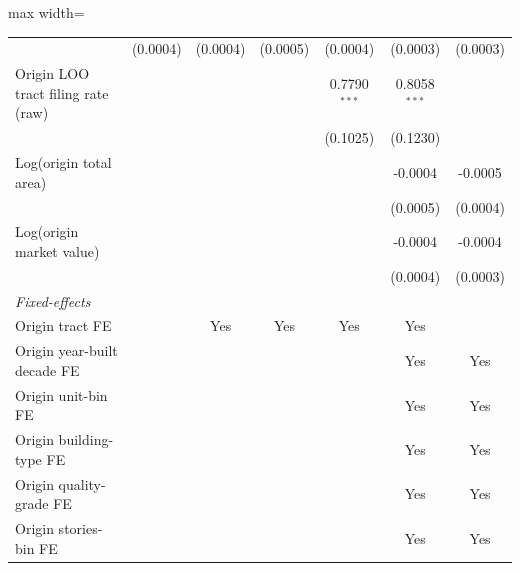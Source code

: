 \documentclass[
  11pt,
]{article}
\begin{document}
\begin{adjustbox}{max width=\textwidth}
\begin{tabular}{lcccccc}
                                                  & (0.0004)               & (0.0004)       & (0.0005)              & (0.0004)       & (0.0003)       & (0.0003)\\   
   Origin LOO tract filing rate (raw)             &                        &                &                       & 0.7790$^{***}$ & 0.8058$^{***}$ &   \\   
                                                  &                        &                &                       & (0.1025)       & (0.1230)       &   \\   
   Log(origin total area)                         &                        &                &                       &                & -0.0004        & -0.0005\\   
                                                  &                        &                &                       &                & (0.0005)       & (0.0004)\\   
   Log(origin market value)                       &                        &                &                       &                & -0.0004        & -0.0004\\   
                                                  &                        &                &                       &                & (0.0004)       & (0.0003)\\   
   \midrule
   \emph{Fixed-effects}\\
   Origin tract FE                                &                        & Yes            & Yes                   & Yes            & Yes            & \\  
   Origin year-built decade FE                    &                        &                &                       &                & Yes            & Yes\\  
   Origin unit-bin FE                             &                        &                &                       &                & Yes            & Yes\\  
   Origin building-type FE                        &                        &                &                       &                & Yes            & Yes\\  
   Origin quality-grade FE                        &                        &                &                       &                & Yes            & Yes\\  
   Origin stories-bin FE                          &                        &                &                       &                & Yes            & Yes\\  

\end{tabular}
\end{adjustbox}
\end{document}
